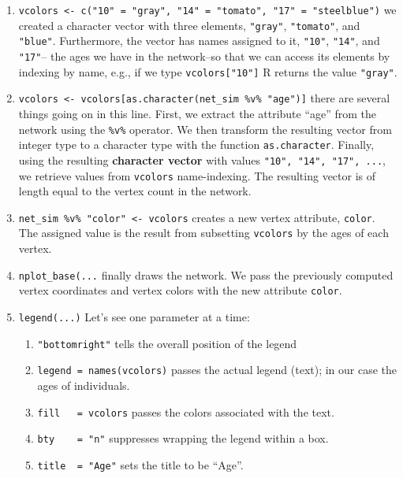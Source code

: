 \documentclass[]{book}
\begin{document}
\begin{enumerate}
\def\labelenumi{\arabic{enumi}.}
\item
  \texttt{vcolors\ \textless{}-\ c("10"\ =\ "gray",\ "14"\ =\ "tomato",\ "17"\ =\ "steelblue")} we created
  a character vector with three elements, \texttt{"gray"}, \texttt{"tomato"}, and \texttt{"blue"}.
  Furthermore, the vector has names assigned to it, \texttt{"10"}, \texttt{"14"}, and \texttt{"17"}--
  the ages we have in the network--so that we can access its
  elements by indexing by name, e.g., if we type \texttt{vcolors{[}"10"{]}} R returns
  the value \texttt{"gray"}.
\item
  \texttt{vcolors\ \textless{}-\ vcolors{[}as.character(net\_sim\ \%v\%\ "age"){]}} there are several things
  going on in this line. First, we extract the attribute ``age'' from the network
  using the \texttt{\%v\%} operator. We then transform the resulting vector from integer type
  to a character type with the function \texttt{as.character}. Finally, using the resulting
  \textbf{character vector} with values \texttt{"10",\ "14",\ "17",\ ...}, we retrieve values
  from \texttt{vcolors} name-indexing. The resulting vector is of length equal to
  the vertex count in the network.
\item
  \texttt{net\_sim\ \%v\%\ "color"\ \textless{}-\ vcolors} creates a
  new vertex attribute, \texttt{color}. The assigned value is the result from subsetting
  \texttt{vcolors} by the ages of each vertex.
\item
  \texttt{nplot\_base(...} finally draws the network. We pass the previously computed
  vertex coordinates and vertex colors with the new attribute \texttt{color}.
\item
  \texttt{legend(...)} Let's see one parameter at a time:

  \begin{enumerate}
  \def\labelenumii{\alph{enumii}.}
  \item
    \texttt{"bottomright"} tells the overall position of the legend
  \item
    \texttt{legend\ =\ names(vcolors)} passes the actual legend (text); in our case
    the ages of individuals.
  \item
    \texttt{fill\ \ \ =\ vcolors} passes the colors associated with the text.
  \item
    \texttt{bty\ \ \ \ =\ "n"} suppresses wrapping the legend within a box.
  \item
    \texttt{title\ \ =\ "Age"} sets the title to be ``Age''.
  \end{enumerate}
\end{enumerate}
\end{document}

